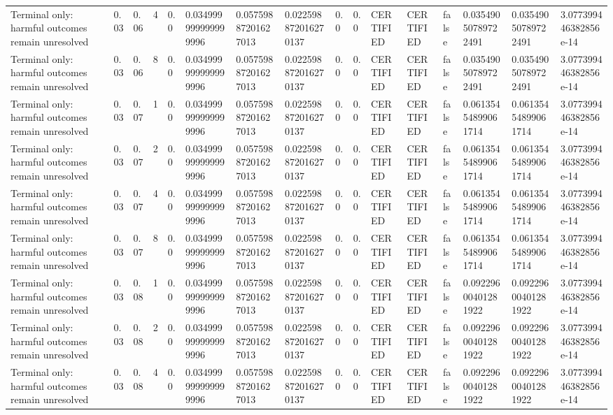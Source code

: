 \begin{tabular}{llllllllllllllll}
Terminal only: harmful outcomes remain unresolved & 0.03 & 0.06 & 4 & 0.0 & 0.034999999999999996 & 0.05759887201627013 & 0.022598872016270137 & 0.0 & 0.0 & CERTIFIED & CERTIFIED & false & 0.03549050789722491 & 0.03549050789722491 & 3.077399446382856e-14 \\
Terminal only: harmful outcomes remain unresolved & 0.03 & 0.06 & 8 & 0.0 & 0.034999999999999996 & 0.05759887201627013 & 0.022598872016270137 & 0.0 & 0.0 & CERTIFIED & CERTIFIED & false & 0.03549050789722491 & 0.03549050789722491 & 3.077399446382856e-14 \\
Terminal only: harmful outcomes remain unresolved & 0.03 & 0.07 & 1 & 0.0 & 0.034999999999999996 & 0.05759887201627013 & 0.022598872016270137 & 0.0 & 0.0 & CERTIFIED & CERTIFIED & false & 0.06135454899061714 & 0.06135454899061714 & 3.077399446382856e-14 \\
Terminal only: harmful outcomes remain unresolved & 0.03 & 0.07 & 2 & 0.0 & 0.034999999999999996 & 0.05759887201627013 & 0.022598872016270137 & 0.0 & 0.0 & CERTIFIED & CERTIFIED & false & 0.06135454899061714 & 0.06135454899061714 & 3.077399446382856e-14 \\
Terminal only: harmful outcomes remain unresolved & 0.03 & 0.07 & 4 & 0.0 & 0.034999999999999996 & 0.05759887201627013 & 0.022598872016270137 & 0.0 & 0.0 & CERTIFIED & CERTIFIED & false & 0.06135454899061714 & 0.06135454899061714 & 3.077399446382856e-14 \\
Terminal only: harmful outcomes remain unresolved & 0.03 & 0.07 & 8 & 0.0 & 0.034999999999999996 & 0.05759887201627013 & 0.022598872016270137 & 0.0 & 0.0 & CERTIFIED & CERTIFIED & false & 0.06135454899061714 & 0.06135454899061714 & 3.077399446382856e-14 \\
Terminal only: harmful outcomes remain unresolved & 0.03 & 0.08 & 1 & 0.0 & 0.034999999999999996 & 0.05759887201627013 & 0.022598872016270137 & 0.0 & 0.0 & CERTIFIED & CERTIFIED & false & 0.09229600401281922 & 0.09229600401281922 & 3.077399446382856e-14 \\
Terminal only: harmful outcomes remain unresolved & 0.03 & 0.08 & 2 & 0.0 & 0.034999999999999996 & 0.05759887201627013 & 0.022598872016270137 & 0.0 & 0.0 & CERTIFIED & CERTIFIED & false & 0.09229600401281922 & 0.09229600401281922 & 3.077399446382856e-14 \\
Terminal only: harmful outcomes remain unresolved & 0.03 & 0.08 & 4 & 0.0 & 0.034999999999999996 & 0.05759887201627013 & 0.022598872016270137 & 0.0 & 0.0 & CERTIFIED & CERTIFIED & false & 0.09229600401281922 & 0.09229600401281922 & 3.077399446382856e-14 \\

\end{tabular}
